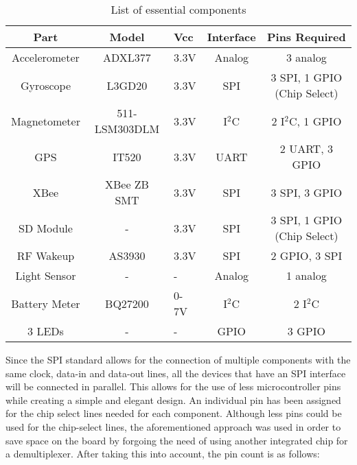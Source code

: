 \begin{table}[H]
\setlength{\extrarowheight}{1.5pt}
  \centering
  \caption{List of essential components}
    \begin{tabular}{|c|c|m{0.35in}|c|c|}
    \hline
    Part  & Model & \centering Vcc & Interface & Pins Required \\
    \hline \hline
    Accelerometer & ADXL377 & \centering 3.3V  & Analog & 3 analog \\ \hline
    Gyroscope & L3GD20 & \centering 3.3V  & SPI   & 3 SPI, 1 GPIO (Chip Select) \\ \hline
    Magnetometer & 511-LSM303DLM & \centering 3.3V  & I$^2$C   & 2 I$^2$C, 1 GPIO \\ \hline
    GPS   & IT520 & \centering 3.3V   & UART  & 2 UART, 3 GPIO \\ \hline 
    XBee  & XBee ZB SMT &\centering 3.3V  & SPI   & 3 SPI, 3 GPIO \\ \hline
    SD Module &   \centering -    & \centering 3.3V  & SPI   & 3 SPI, 1 GPIO (Chip Select) \\ \hline
    RF Wakeup & AS3930 & \centering 3.3V  & SPI   & 2 GPIO, 3 SPI \\ \hline
    Light Sensor & \centering - & \centering - & Analog & 1 analog \\ \hline
    Battery Meter & BQ27200 & 0-7V & \centering I$^2$C & 2 I$^2$C \\ \hline
    3 LEDs & \centering - & \centering - & GPIO & 3 GPIO \\ \hline
    
    \end{tabular}%
  \label{tab:componentPinCount}%
\end{table}%

Since the SPI standard allows for the connection of multiple components with the same clock, data-in and data-out lines, all the devices that have an SPI interface will be connected in parallel.  This allows for the use of less microcontroller pins while creating a simple and elegant design.  An individual pin has been assigned for the chip select lines needed for each component.  Although less pins could be used for the chip-select lines, the aforementioned approach was used in order to save space on the board by forgoing the need of using another integrated chip for a demultiplexer.  After taking this into account, the pin count is as follows:

